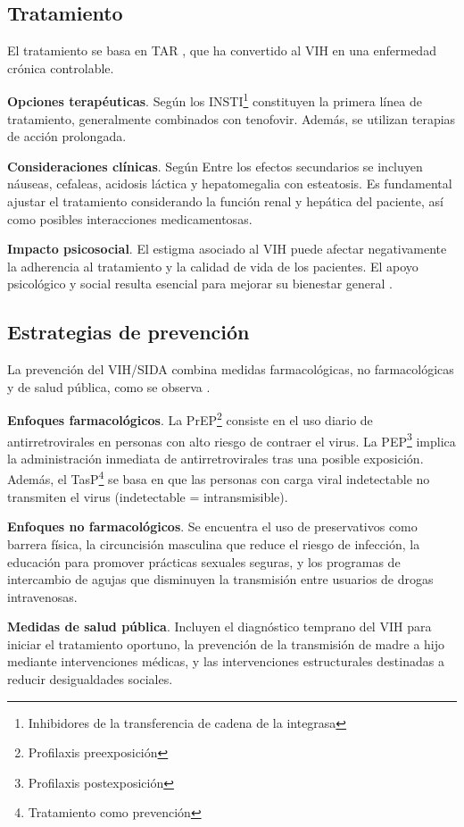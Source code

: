 \subsection{Tratamiento}
El tratamiento se basa en TAR \cite{heendeniya2019antiretroviral}, que ha convertido al VIH en una enfermedad crónica controlable.

\textbf{Opciones terapéuticas}. Según \cite{sivanandy2023efficacy} los INSTI\footnote{Inhibidores de la transferencia de cadena de la integrasa} constituyen la primera línea de tratamiento, generalmente combinados con tenofovir. Además, se utilizan terapias de acción prolongada.

\textbf{Consideraciones clínicas}. Según \cite{saag2021hiv} Entre los efectos secundarios se incluyen náuseas, cefaleas, acidosis láctica y hepatomegalia con esteatosis. Es fundamental ajustar el tratamiento considerando la función renal y hepática del paciente, así como posibles interacciones medicamentosas.

\textbf{Impacto psicosocial}. El estigma asociado al VIH puede afectar negativamente la adherencia al tratamiento y la calidad de vida de los pacientes. El apoyo psicológico y social resulta esencial para mejorar su bienestar general \cite{cihlar2016current}.

\subsection{Estrategias de prevención}
La prevención del VIH/SIDA \cite{chan2012biomedical} combina medidas farmacológicas, no farmacológicas y de salud pública, como se observa .

\textbf{Enfoques farmacológicos}.
La PrEP\footnote{Profilaxis preexposición} consiste en el uso diario de antirretrovirales en personas con alto riesgo de contraer el virus. La PEP\footnote{Profilaxis postexposición} implica la administración inmediata de antirretrovirales tras una posible exposición. Además, el TasP\footnote{Tratamiento como prevención} se basa en que las personas con carga viral indetectable no transmiten el virus (indetectable = intransmisible).

\textbf{Enfoques no farmacológicos}.
Se encuentra el uso de preservativos como barrera física, la circuncisión masculina que reduce el riesgo de infección, la educación para promover prácticas sexuales seguras, y los programas de intercambio de agujas que disminuyen la transmisión entre usuarios de drogas intravenosas.

\textbf{Medidas de salud pública}.
Incluyen el diagnóstico temprano del VIH para iniciar el tratamiento oportuno, la prevención de la transmisión de madre a hijo mediante intervenciones médicas, y las intervenciones estructurales destinadas a reducir desigualdades sociales.

